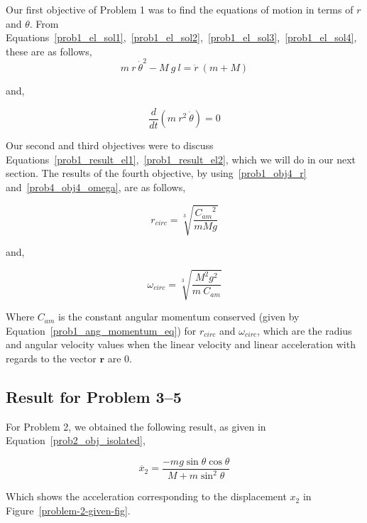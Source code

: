 \documentclass[conference]{IEEEtran}
\begin{document}
Our first objective of Problem 1 was to find the equations of motion in terms
of $r$ and $\theta$. From Equations~\ref{prob1_el_sol1},~\ref{prob1_el_sol2},~\ref{prob1_el_sol3},~\ref{prob1_el_sol4}, these are as follows,\\

\begin{equation}\label{prob1_result_el1}
    \boxed{
        m~r~\dot{\theta}^2 - M~g~l = \ddot{r}~(m + M)
    }
\end{equation}

and,

\begin{equation}\label{prob1_result_el2}
    \boxed{
        \frac{d}{dt}\left( m~r^2~\dot{\theta} \right) = 0
    }
\end{equation}

Our second and third objectives were to discuss Equations~\ref{prob1_result_el1},~\ref{prob1_result_el2},
which we will do in our next section. The results of the fourth objective, by using~\ref{prob1_obj4_r}
and~\ref{prob4_obj4_omega}, are as follows,

\begin{equation}
    \boxed{r_{circ} = \sqrt[3]{\frac{{C_{am}}^2}{mMg}}}
\end{equation}

and,

\begin{equation}
    \boxed{\omega_{circ} = \sqrt[3]{\frac{M^2g^2}{m~C_{am}}}}
\end{equation}

Where $C_{am}$ is the constant angular momentum conserved (given by Equation~\ref{prob1_ang_momentum_eq}) for $r_{circ}$ and $\omega_{circ}$,
which are the radius and angular velocity values when the linear velocity and linear acceleration with
regards to the vector $\textbf{r}$ are 0.

\subsection{Result for Problem 3--5}

For Problem 2, we obtained the following result, as given in Equation~\ref{prob2_obj_isolated},

\[
    \boxed{
        \ddot{x_2} = \frac{-mg\sin\theta\cos\theta}{M + m \sin^2\theta}     
    }
\]

Which shows the acceleration corresponding to the displacement $x_2$ in Figure~\ref{problem-2-given-fig}.
\end{document}
